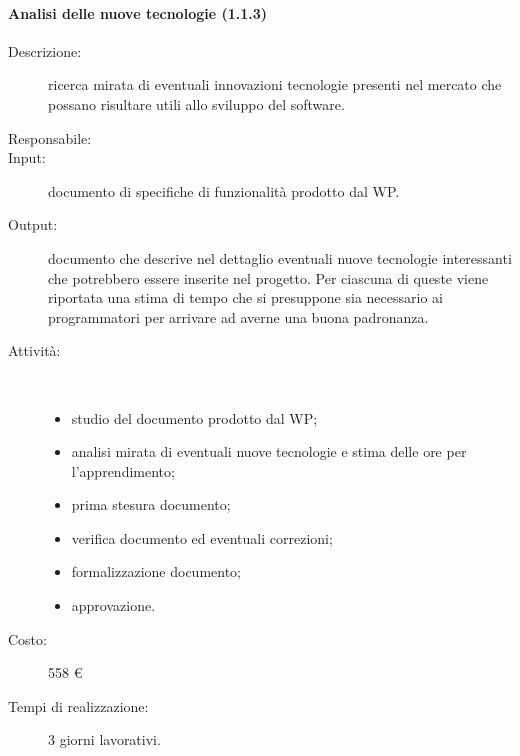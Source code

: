 \paragraph{Analisi delle nuove tecnologie (1.1.3)}
\begin{description}
\item[Descrizione:] ricerca mirata di eventuali innovazioni tecnologie presenti nel mercato che possano risultare utili allo sviluppo del software.
\item[Responsabile:]
\item[Input:] documento di specifiche di funzionalità prodotto dal WP.
\item[Output:] documento che descrive nel dettaglio eventuali nuove tecnologie interessanti che potrebbero essere inserite nel progetto. Per ciascuna di queste viene riportata una stima di tempo che si presuppone sia necessario ai programmatori per arrivare ad averne una buona padronanza.
\item[Attività:]\mbox{}\\[-1.5\baselineskip]
	\begin{itemize}
	\item studio del documento prodotto dal WP;
	\item analisi mirata di eventuali nuove tecnologie e stima delle ore per l'apprendimento;
	\item prima stesura documento;
	\item verifica documento ed eventuali correzioni;
	\item formalizzazione documento;
	\item approvazione.
	\end{itemize}
\item[Costo:] 558 \euro{}
\item[Tempi di realizzazione:] 3 giorni lavorativi.
\end{description}

